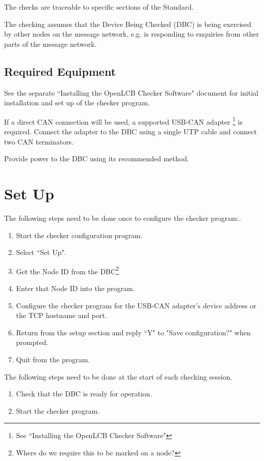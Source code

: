 The checks are traceable to specific sections of the Standard.

The checking assumes that the Device Being Checked (DBC) is being exercised by other
nodes on the message network, 
e.g. is responding to enquiries from other parts of the message network.

\subsection{Required Equipment}

See the separate ``Installing the OpenLCB Checker Software" document for initial installation 
and set up of the checker program.

If a direct CAN connection will be used,
a supported USB-CAN adapter
    \footnote{See ``Installing the OpenLCB Checker Software"}
is required. 
Connect the adapter to the DBC using a single UTP cable and connect two CAN terminators.

Provide power to the DBC using its recommended method.

\section{Set Up}
The following steps need to be done once to configure the checker program:.
\begin{enumerate}
\item Start the checker configuration program. 
\item Select ``Set Up".
\item Get the Node ID from the DBC\footnote{Where do we require this to be marked on a node?} 
\item Enter that Node ID into the program.
\item Configure the checker program for the USB-CAN adapter's device address
        or the TCP hostname and port.
\item Return from the setup section and reply ``Y" to "Save configuration?" when prompted.
\item Quit from the program.
\end{enumerate}

The following steps need to be done at the start of each checking session.
\begin{enumerate}
\item Check that the DBC is ready for operation.
\item Start the checker program.
\end{enumerate}
